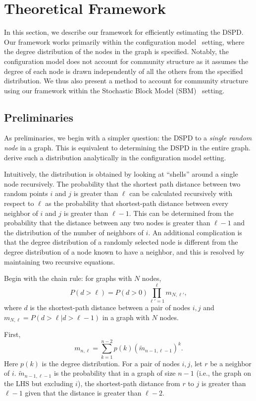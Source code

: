 \section{Theoretical Framework}
\label{sec:framework}

In this section, we describe our framework for efficiently estimating the DSPD. Our framework works primarily within the configuration model~\citep{newman2003structure} setting, where the degree distribution of the nodes in the graph is specified. Notably, the configuration model does not account for community structure as it assumes the degree of each node is drawn independently of all the others from the specified distribution. We thus also present a method to account for community structure using our framework within the Stochastic Block Model (SBM)~\cite{holland1983stochastic} setting.

\subsection{Preliminaries}
\label{sec:preliminaries}

As preliminaries, we begin with a simpler question: the DSPD to a \textit{single random node} in a graph. This is equivalent to determining the DSPD in the entire graph. \citet{nitzan2016distance} derive such a distribution analytically in the configuration model setting.

Intuitively, the distribution is obtained by looking at ``shells'' around a single node recursively. The probability that the shortest path distance between two random points $i$ and $j$ is greater than $\ell$ can be calculated recursively with respect to $\ell$ as the probability that shortest-path distance between every neighbor of $i$ and $j$ is greater than $\ell-1$. This can be determined from the probability that the distance between any two nodes is greater than $\ell-1$ and the distribution of the number of neighbors of $i$. An additional complication is that the degree distribution of a randomly selected node is different from the degree distribution of a node known to have a neighbor, and this is resolved by maintaining two recursive equations.

Begin with the chain rule: for graphs with $N$ nodes,
\[P(d > \ell) = P(d > 0) \prod_{\ell'=1}^\ell m_{N, \ell'}, \]
where $d$ is the shortest-path distance between a pair of nodes $i, j$ and $m_{N, \ell} =  P(d > \ell | d > \ell-1)$ in a graph with $N$ nodes.

First,
\[m_{n, \ell} = \sum_{k=1}^{n-2} p(k) (\tilde{m}_{n-1,\ell-1})^k.\]
Here $p(k)$ is the degree distribution. For a pair of nodes $i,j$, let $r$ be a neighbor of $i$. $\tilde{m}_{n-1,\ell-1}$ is the probability that in a graph of size $n-1$ (i.e., the graph on the LHS but excluding $i$), the shortest-path distance from $r$ to $j$ is greater than $\ell-1$ given that the distance is greater than $\ell - 2$.

